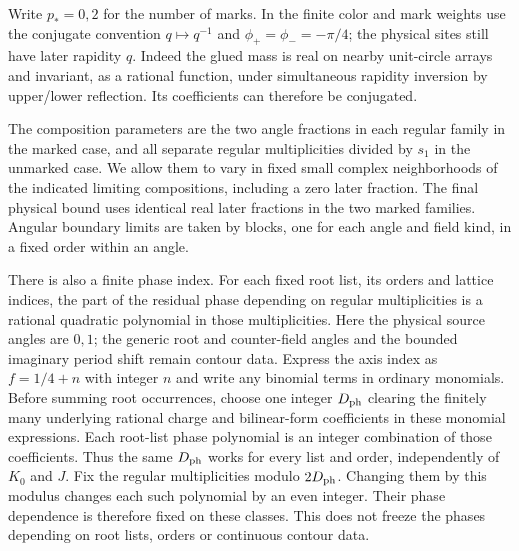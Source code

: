Write $p_*=0,2$ for the number of marks. In the finite color and mark
weights use the conjugate convention $q\mapsto q^{-1}$ and
$\phi_+=\phi_-=-\pi/4$; the physical sites still have later rapidity $q$.
Indeed the glued mass is real on nearby unit-circle arrays and invariant,
as a rational function, under simultaneous rapidity inversion by
upper/lower reflection. Its coefficients can therefore be conjugated.

The composition parameters are the two angle fractions in each regular
family in the marked case, and all separate regular multiplicities divided
by $s_1$ in the unmarked case. We allow them to vary in fixed small complex
neighborhoods of the indicated limiting compositions, including a zero
later fraction. The final physical bound uses identical real later
fractions in the two marked families. Angular boundary limits are taken
by blocks, one for each angle and field kind, in a fixed order within an
angle.

There is also a finite phase index. For each fixed root list, its
orders and lattice indices, the part of the residual phase depending on
regular multiplicities is a rational quadratic polynomial in those
multiplicities. Here the physical source angles are $0,1$; the generic
root and counter-field angles and the bounded imaginary period shift
remain contour data. Express the axis index as $f=1/4+n$ with integer
$n$ and write any binomial terms in ordinary monomials. Before summing root occurrences, choose one integer $D_{\rm ph}$
clearing the finitely many underlying rational charge and bilinear-form
coefficients in these monomial expressions. Each root-list phase
polynomial is an integer combination of those coefficients. Thus the
same $D_{\rm ph}$ works for every list and order, independently of
$K_0$ and $J$. Fix the regular multiplicities
modulo $2D_{\rm ph}$. Changing them by this modulus changes each such
polynomial by an even integer. Their phase dependence is therefore fixed
on these classes. This does not freeze the phases depending on root lists,
orders or continuous contour data.

